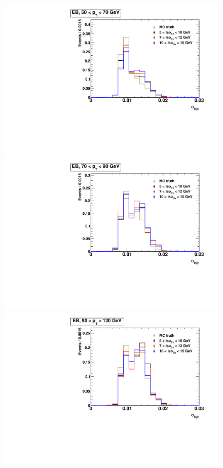 \begin{figure}[!htbp]
	\noindent
	\centering
	\begin{multicols}{2}
		\includegraphics[scale=0.29]{figures/closure_test_fake_template_sieie_EB_pt50To70_sample_all.pdf} \\
		\includegraphics[scale=0.29]{figures/closure_test_fake_template_sieie_EB_pt70To90_sample_all.pdf} \\
		\includegraphics[scale=0.29]{figures/closure_test_fake_template_sieie_EB_pt90To130_sample_all.pdf} \\

\end{multicols}
\end{figure}
